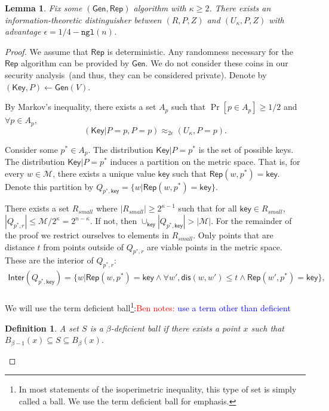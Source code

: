 \documentclass[11pt]{article}
\newcommand{\class}[1]{{\ensuremath{\mathsf{#1}}}}
\newcommand{\key}{\ensuremath{\class{key}}\xspace}
\newcommand{\Key}{\ensuremath{\class{Key}}\xspace}
\newcommand{\gen}{\ensuremath{\class{Gen}}\xspace}
\newcommand{\rep}{\ensuremath{\class{Rep}}\xspace}
\newcommand{\sketch}{\ensuremath{\class{SS}}\xspace}
\newcommand{\rec}{\ensuremath{\class{Rec}}\xspace}
\newcommand{\crust}{\ensuremath{\class{Crust}}\xspace}
\newcommand{\inter}{\ensuremath{\class{Inter}}\xspace}
\newcommand{\dis}{\ensuremath{\mathsf{dis}}}
\newcommand{\ngl}{\ensuremath{\mathtt{ngl}}\xspace}
\newtheorem{lemma}[theorem]{Lemma}
\newtheorem{definition}[theorem]{Definition}
\newcommand{\authnote}[2]{{\textcolor{red}{\textsf{#1 notes: }\textcolor{blue}{ #2}}\marginpar{\textcolor{red}{\textbf{!!!!!}}}}}
\newcommand{\authnote}[2]{}
\newcommand{\bnote}[1]{{\authnote{Ben}{#1}}}
\begin{document}
\begin{lemma}
\label{lem:fuzz can't get key}
Fix some $(\gen, \rep)$ algorithm with $\kappa \ge 2$.  There exists an information-theoretic distinguisher between $(R, P, Z)$ and $(U_\kappa, P, Z)$ with advantage $\epsilon = 1/4-\ngl(n)$.
\end{lemma}
\begin{proof}
We assume that $\rep$ is deterministic.  Any randomness necessary for the \rep algorithm can be provided by $\gen$.  We do not consider these coins in our security analysis~(and thus, they can be considered private).  Denote by $(\Key, P) \leftarrow \gen(V)$.

By Markov's inequality, there exists a set $A_{p}$ such that $\Pr[p\in A_{p}]\ge 1/2$ and $\forall p\in A_{p}$, 
\[
(\Key |P =p, P = p ) \approx_{2\epsilon} (U_\kappa , P =p).
\]

Consider some $p^*\in A_{p}$.  %
The distribution $\Key|P=p^*$ is the set of possible keys.
The distribution $\Key|P=p^*$ induces a partition on the metric space.  That is, for every $w\in\mathcal{M}$, there exists a unique value $\key$ such that $\rep(w, p^*) =\key$.  Denote this partition by $Q_{p^*,\key} = \{w | \rep(w, p^*) = \key\}$.  

There exists a set $R_{small}$  where $|R_{small} | \ge 2^{\kappa-1}$ such that for all $\key\in R_{small}$,  $|Q_{p^*, r}|\le \mathcal{M}/2^{\kappa} = 2^{n-\kappa }$.  If not, then $\cup_{\key} |Q_{p^*, \key}| > |\mathcal{M}|$.
For the remainder of the proof we restrict ourselves to elements in $R_{small}$.  Only points that are distance $t$ from points outside of $Q_{p^*, r}$ are viable points in the metric space.  These are the interior of $Q_{p^*, r}$:
\begin{align*}
\inter(Q_{p^*, \key}) = \{w | \rep(w, p^*) = \key \wedge \forall w', \dis(w, w') \le t \wedge \rep(w', p^*) =\key\},\\
\end{align*}

We will use the term deficient ball\footnote{In most statements of the isoperimetric inequality, this type of set is simply called a ball.  We use the term deficient ball for emphasis.}:\bnote{use a term other than deficient}
\begin{definition}
A set $S$ is a $\beta$-deficient ball if there exists a point $x$ such that $B_{\beta-1}(x) \subseteq S \subseteq B_{\beta}(x)$.
\end{definition}


\end{proof}
\end{document}
